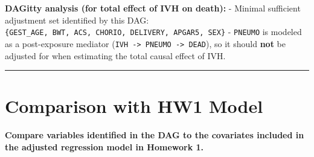 \documentclass[
]{article}
\begin{document}
\textbf{DAGitty analysis (for total effect of IVH on death):} - Minimal
sufficient adjustment set identified by this DAG:\\
\texttt{\{GEST\_AGE,\ BWT,\ ACS,\ CHORIO,\ DELIVERY,\ APGAR5,\ SEX\}} -
\texttt{PNEUMO} is modeled as a post-exposure mediator
(\texttt{IVH\ -\textgreater{}\ PNEUMO\ -\textgreater{}\ DEAD}), so it
should \textbf{not} be adjusted for when estimating the total causal
effect of IVH.

\begin{center}\rule{0.5\linewidth}{0.5pt}\end{center}

\hypertarget{comparison-with-hw1-model}{%
\section{Comparison with HW1 Model}\label{comparison-with-hw1-model}}

\textbf{Compare variables identified in the DAG to the covariates
included in the adjusted regression model in Homework 1.}
\end{document}
